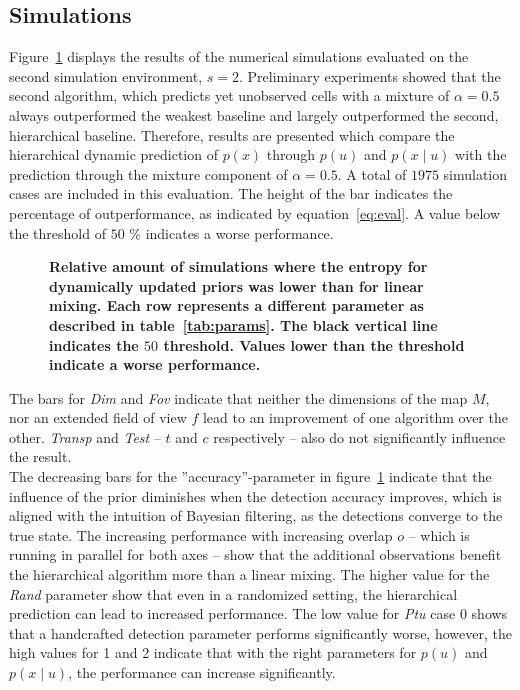 \documentclass[twocolumn,letterpaper]{IEEEAerospaceCLS}  %
\begin{document}
\subsection{Simulations} \label{ssec:ResSim}
Figure~\ref{fig:Res} displays the results of the numerical simulations evaluated on the second simulation environment, $s=2$. Preliminary experiments showed that the second algorithm, which predicts yet unobserved cells with a mixture of $\alpha = 0.5$ always outperformed the weakest baseline and largely outperformed the second, hierarchical baseline. Therefore, results are presented which compare the hierarchical dynamic prediction of $p(x)$ through $p(u)$ and $p(x\mid u)$ with the prediction through the mixture component of $\alpha = 0.5$. A total of $1975$ simulation cases are included in this evaluation. The height of the bar indicates the percentage of outperformance, as indicated by equation~\ref{eq:eval}. A value below the threshold of $50$ \% indicates a worse performance.
\begin{figure}
    \centering
    \caption{\bf{
        Relative amount of simulations where the entropy for dynamically updated priors was lower than for linear mixing. Each row represents a different parameter as described in table~\ref{tab:params}. The black vertical line indicates the $50$ threshold. Values lower than the threshold indicate a worse performance.
    }}
    \label{fig:Res}
\end{figure}
The bars for \emph{Dim} and \emph{Fov} indicate that neither the dimensions of the map $M$, nor an extended field of view $f$ lead to an improvement of one algorithm over the other. \emph{Transp} and \emph{Test} -- $t$ and $c$ respectively -- also do not significantly influence the result.\\
The decreasing bars for the ''accuracy''-parameter in figure~\ref{fig:Res} indicate that the influence of the prior diminishes when the detection accuracy improves, which is aligned with the intuition of Bayesian filtering, as the detections converge to the true state. The increasing performance with increasing overlap $o$ -- which is running in parallel for both axes -- show that the additional observations benefit the hierarchical algorithm more than a linear mixing. The higher value for the \emph{Rand} parameter show that even in a randomized setting, the hierarchical prediction can lead to increased performance. The low value for \emph{Ptu} case 0 shows that a handcrafted detection parameter performs significantly worse, however, the high values for 1 and 2 indicate that with the right parameters for $p(u)$ and $p(x\mid u)$, the performance can increase significantly.
\end{document}
